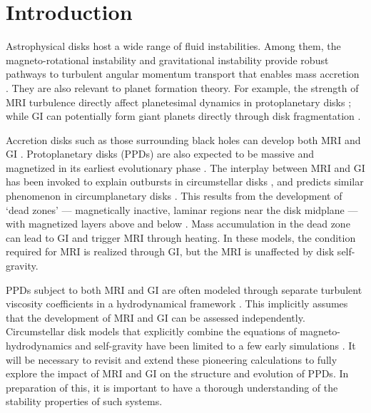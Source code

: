 \documentclass[iop]{emulateapj}
\begin{document}
\section{Introduction}
Astrophysical disks host a wide range of fluid instabilities. Among
them, the magneto-rotational instability \citep[MRI,][]{chandrasekhar61,
  balbus91,balbus98} 
and gravitational instability \citep[GI, ][]{toomre64,goldreich65a,goldreich65b} 
provide robust pathways to turbulent angular momentum transport that
enables mass accretion \citep[][ 
  and references therein]{balbus99,armitage11,turner14}.   
They are also relevant to planet formation theory. For example,
the strength of MRI turbulence directly affect planetesimal dynamics
in protoplanetary disks \citep{yang12,gressel12}; while GI can
potentially form giant planets directly through disk fragmentation
\citep{boss97,boss98,gammie01,voro13,helled14}. 


Accretion disks such as those surrounding black holes can develop both
MRI and GI \citep{menou01,goodman03}.  
Protoplanetary disks (PPDs) are also expected to be massive and  
magnetized in its earliest evolutionary phase \citep{inutsuka10}.  
The interplay between MRI and GI has been invoked to explain outbursts
in circumstellar disks \citep{armitage01, zhu10a, zhu10b,
  martin12b}, and predicts similar phenomenon in circumplanetary disks
\citep{lubow12}. This results from the development of `dead zones' 
--- magnetically inactive, laminar regions near the disk midplane --- with
magnetized layers above and below 
\citep{gammie96,martin12,landry13}. Mass accumulation in the dead zone can lead to
GI and trigger MRI through heating. In these models, the condition required
for MRI is realized through GI, but the MRI is unaffected by disk
self-gravity. 


PPDs subject to both MRI and GI are often modeled through separate
turbulent viscosity coefficients in a hydrodynamical framework 
\citep{terquem08}. This implicitly assumes that the development of MRI 
and GI can be assessed independently. 
Circumstellar disk models that explicitly combine the equations of magneto-hydrodynamics
and self-gravity have been limited to a few early simulations 
\citep{fromang04,fromang04b,fromang05}. It will be necessary to 
revisit and extend these pioneering calculations to fully explore the
impact of MRI and GI on the structure and evolution of PPDs. In
preparation of this, it is important to have a thorough understanding
of the stability properties of such systems.  
\end{document}
